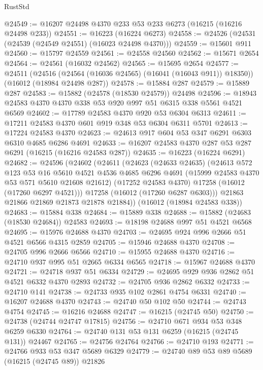 \begin{lexlean}{RustStd}
\begin{coremodule}
@24549 := @16207 @24498 @4370 @233 @53 @233 @6273 (@16215 (@16216 @24498 @233))
@24551 := @16223 (@16224 @6273)
@24558 := @24526 (@24531 (@24539 (@24549 @24551) (@16023 @24498 @4370)))
@24559 := @15601 @911
@24560 := @15797 @24559
@24561 := @24558 @24560
@24562 := @15671 @2654
@24564 := @24561 (@16032 @24562)
@24565 := @15695 @2654
@24577 := @24511
    (@24516 (@24564 (@16036 @24565) (@16041 (@16043 @911)) @18350))
    (@16012 (@18984 @24498 @287))
@24578 := @15884 @287
@24579 := @15889 @287
@24583 := @15882 (@24578 (@18530 @24579)) @24498
@24596 := @18943 @24583 @4370 @4370 @338 @53 @920 @997 @51 @6315 @338 @5561 @4521 @6569
@24602 := @17789 @24583 @4370 @920 @53 @6304 @6313
@24611 := @17211 @24583 @4370 @601 @919 @348 @53 @6304 @6311 @5701
@24613 := @17224 @24583 @4370
@24623 := @24613 @917 @604 @53 @347 @6291 @6303 @6310 @4685 @6286 @4691
@24633 := @16207 @24583 @4370 @287 @53 @287 @6291 (@16215 (@16216 @24583 @287))
@24635 := @16223 (@16224 @6291)
@24682 := @24596
    (@24602
      (@24611
        (@24623
          (@24633 @24635)
          (@24613
            @572
            @123
            @53
            @16
            @5610
            @4521
            @4536
            @4685
            @6296
            @4691
            (@15999 @24583 @4370 @53 @571 @5610 @21608 @21612)
            (@17252 @24583 @4370)
            @17258
            (@16012 (@17260 @6297 @4521)))
          @17258
          (@16012 (@17260 @6287 @6303)))
        @21863
        @21866
        @21869
        @21873
        @21878
        @21884))
    (@16012 (@18984 @24583 @338))
@24683 := @15884 @338
@24684 := @15889 @338
@24688 := @15882 (@24683 (@18530 @24684)) @24583
@24693 := @18198 @24688 @997 @51 @4521 @6568
@24695 := @15976 @24688 @4370
@24703 := @24695 @924 @996 @2666 @51 @4521 @6566 @4315 @2859
@24705 := @15946 @24688 @4370
@24708 := @24705 @996 @2666 @6566
@24710 := @15955 @24688 @4370
@24716 := @24710 @937 @995 @51 @2665 @6334 @6565
@24718 := @15967 @24688 @4370
@24721 := @24718 @937 @51 @6334
@24729 := @24695 @929 @936 @2862 @51 @4521 @6332 @4370 @2893
@24732 := @24705 @936 @2862 @6332
@24733 := @24710 @141
@24738 := @24733 @935 @102 @2861 @4754 @6331
@24740 := @16207 @24688 @4370
@24743 := @24740 @50 @102 @50
@24744 := @24743 @4754
@24745 := @16216 @24688
@24747 := @16215 (@24745 @50)
@24750 := @24738 (@24744 @24747 @17815)
@24756 := @24710 @671 @934 @53 @348 @6259 @6330
@24764 := @24740 @131 @53 @131 @6259 (@16215 (@24745 @131)) @24467
@24765 := @24756 @24764
@24766 := @24710 @193
@24771 := @24766 @933 @53 @347 @5689 @6329
@24779 := @24740 @89 @53 @89 @5689 (@16215 (@24745 @89)) @21826

\end{coremodule}
\end{lexlean}
